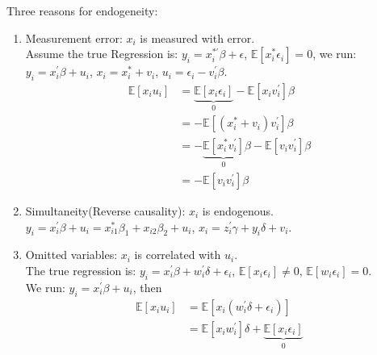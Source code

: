Three reasons for endogeneity:
\begin{enumerate}
    \item Measurement error: $x_i$ is measured with error.
        \\
        Assume the true Regression is: $y_i = x_i^{* \prime} \beta +\epsilon$, $\mathbb{E}[x_i^* \epsilon_i] = 0$,
        we run: $y_i = x_i^{\prime} \beta +u_i$, $x_i = x_i^* + v_i$, $u_i = \epsilon_i - v_i^{\prime} \beta$.
        \begin{align*}
            \mathbb{E}[x_i u_i] &= \underset{0}{\underbrace{\mathbb{E}[x_i \epsilon_i]}} - \mathbb{E}[x_i v_i^{\prime} ]\beta \\
            &= -\mathbb{E}[(x_i^* + v_i) v_i^{\prime} ]\beta \\
            &= -\underset{0}{\underbrace{\mathbb{E}[x_i^* v_i^{\prime}]}}\beta - \mathbb{E}[v_i v_i^{\prime} ]\beta \\
            &= - \mathbb{E}[v_i v_i^{\prime} ]\beta
        \end{align*}
    \item Simultaneity(Reverse causality): $x_i$ is endogenous.\\
        $y_i = x_i^{\prime} \beta + u_i = x_{i1}^* \beta_1 + x_{i2} \beta_2  + u_i$, $x_i = z_i^{\prime} \gamma + y_i \delta+ v_i$.\\

    \item Omitted variables: $x_i$ is correlated with $u_i$.\\
        The true regression is: $y_i = x_i^{\prime} \beta + w_i^{\prime} \delta +\epsilon_i$, $\mathbb{E}[x_i \epsilon_i] \neq 0$, $\mathbb{E}[w_i \epsilon_i] = 0$.\\
        We run: $y_i = x_i^{\prime} \beta + u_i$, then
        \begin{align*}
            \mathbb{E}[x_i u_i] &= \mathbb{E}[x_i(w_i^{\prime} \delta + \epsilon_i)] \\
            &= \mathbb{E}[x_i w_i^{\prime}]\delta + \underset{0}{\underbrace{\mathbb{E}[x_i \epsilon_i]}}
        \end{align*}
\end{enumerate}

